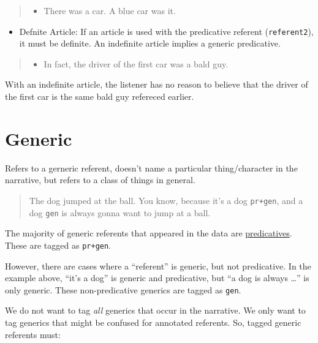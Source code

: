 \documentclass[
]{book}
\providecommand{\tightlist}{%
  \setlength{\itemsep}{0pt}\setlength{\parskip}{0pt}}
\begin{document}
\begin{quote}
\begin{itemize}
\tightlist
\item
  There was a car.
  A blue car was it.
\end{itemize}
\end{quote}

\begin{itemize}
\tightlist
\item
  Defnite Article: If an article is used
  with the predicative referent (\texttt{referent2}),
  it must be definite.
  An indefinite article implies a generic predicative.
\end{itemize}

\begin{quote}
\begin{itemize}
\tightlist
\item
  In fact, the driver of the first car was a bald guy.
\end{itemize}
\end{quote}

With an indefinite article,
the listener has no reason to believe that the driver of the first car
is the same bald guy refereced earlier.

\hypertarget{generic}{%
\section{Generic}\label{generic}}

Refers to a gerneric referent,
doesn't name a particular thing/character in the narrative,
but refers to a class of things in general.

\begin{quote}
The dog jumped at the ball.
You know, because it's a dog \texttt{pr+gen},
and a dog \texttt{gen} is always gonna want to jump at a ball.
\end{quote}

The majority of generic referents that appeared in the data are \protect\hyperlink{predicative}{predicatives}. These are tagged as \texttt{pr+gen}.

However,
there are cases where a ``referent'' is generic, but not predicative.
In the example above, ``it's a dog'' is generic and predicative,
but ``a dog is always \ldots{}'' is only generic.
These non-predicative generics are tagged as \texttt{gen}.

We do not want to tag \emph{all} generics that occur in the narrative.
We only want to tag generics that might be confused for annotated referents.
So, tagged generic referents must:
\end{document}
